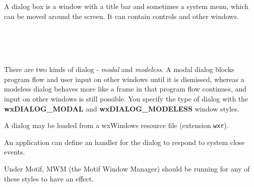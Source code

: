 \section{}\label{wxdialog}

A dialog box is a window with a title bar and sometimes a system menu, which can be moved around
the screen. It can contain controls and other windows.


\\
\\
\\


There are two kinds of dialog - {\it modal} and {\it modeless}. A modal dialog
blocks program flow and user input on other windows until it is dismissed, whereas a modeless dialog behaves more
like a frame in that program flow continues, and input on other windows is still possible.
You specify the type of dialog with the {\bf wxDIALOG\_MODAL} and {\bf wxDIALOG\_MODELESS} window
styles.

A dialog may be loaded from a wxWindows resource file (extension {\tt wxr}).

An application can define an  handler for the
dialog to respond to system close events.


\twocolwidtha{5cm}
\begin{twocollist}\itemsep=0pt
\end{twocollist}

Under Motif, MWM (the Motif Window Manager) should be running for any of these styles to have an effect.

